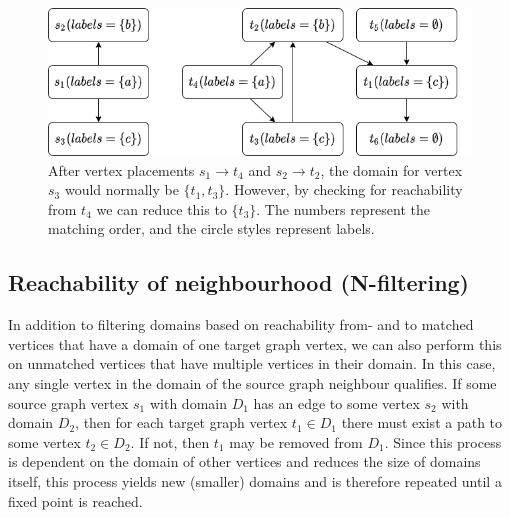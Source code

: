 \begin{figure}
\centering

\includegraphics[scale=0.6]{images/contraction/pruningExample.png}

\caption{After vertex placements $s_1 \to t_4$ and $s_2 \to t_2$, the domain for vertex $s_3$ would normally be $\{t_1, t_3\}$. However, by checking for reachability from $t_4$ we can reduce this to $\{t_3\}$. The numbers represent the matching order, and the circle styles represent labels.}
\label{fig:reachability-filtered}
\end{figure}
\subsection{Reachability of neighbourhood \hspace{12pt}(N-filtering)}
In addition to filtering domains based on reachability from- and to matched vertices that have a domain of one target graph vertex, we can also perform this on unmatched vertices that have multiple vertices in their domain. In this case, any single vertex in the domain of the source graph neighbour qualifies. If some source graph vertex $s_1$ with domain $D_1$ has an edge to some vertex $s_2$ with domain $D_2$, then for each target graph vertex $t_1 \in D_1$ there must exist a path to some vertex $t_2 \in D_2$. If not, then $t_1$ may be removed from $D_1$. Since this process is dependent on the domain of other vertices and reduces the size of domains itself, this process yields new (smaller) domains and is therefore repeated until a fixed point is reached.

